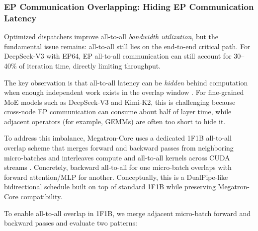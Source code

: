 \documentclass[10pt,logo,copyright]{nvidiatechreport}
\begin{document}
\subsubsection{EP Communication Overlapping: Hiding EP Communication Latency}\label{sec:comm-overlap}

Optimized dispatchers improve all-to-all \textit{bandwidth utilization}, but the fundamental issue remains: all-to-all still lies on the end-to-end critical path. For DeepSeek-V3 with EP64, EP all-to-all communication can still account for 30--40\% of iteration time, directly limiting throughput.

The key observation is that all-to-all latency can be \textit{hidden} behind computation when enough independent work exists in the overlap window \cite{wang2022coconet,wang2024flux}. For fine-grained MoE models such as DeepSeek-V3 and Kimi-K2, this is challenging because cross-node EP communication can consume about half of layer time, while adjacent operators (for example, GEMMs) are often too short to hide it.

To address this imbalance, Megatron-Core uses a dedicated 1F1B all-to-all overlap scheme \cite{1f1boverlap} that merges forward and backward passes from neighboring micro-batches and interleaves compute and all-to-all kernels across CUDA streams \cite{narayanan2019pipedream,huang2019gpipe}. Concretely, backward all-to-all for one micro-batch overlaps with forward attention/MLP for another. Conceptually, this is a DualPipe-like \cite{hfdualpipe} bidirectional schedule built on top of standard 1F1B while preserving Megatron-Core compatibility.

To enable all-to-all overlap in 1F1B, we merge adjacent micro-batch forward and backward passes and evaluate two patterns:
\end{document}
